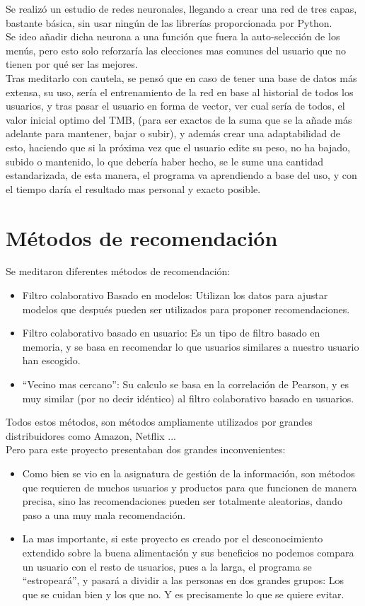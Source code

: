 Se realizó un estudio de redes neuronales, llegando a crear una red de tres capas, bastante básica, sin usar ningún de las librerías proporcionada por Python.\\

Se ideo añadir dicha neurona a una función que fuera la auto-selección de los menús, pero esto solo reforzaría las elecciones mas comunes del usuario que no tienen por qué ser las mejores.\\

Tras meditarlo con cautela, se pensó que en caso de tener una base de datos más extensa, su uso, sería el entrenamiento de la red en base al historial de todos los usuarios, y  tras pasar el usuario en forma de vector, ver cual sería de todos, el valor inicial optimo del TMB, (para ser exactos de la suma que se la añade más adelante para mantener, bajar o subir), y además crear una adaptabilidad de esto, haciendo que si la próxima vez que el usuario edite su peso, no ha bajado, subido o mantenido, lo que debería haber hecho, se le sume una cantidad estandarizada, de esta manera, el programa va aprendiendo a base del uso, y con el tiempo daría el resultado mas personal y exacto posible.\\
\section{Métodos de recomendación}
Se meditaron diferentes métodos de recomendación:
\begin{itemize}
\item	Filtro colaborativo Basado en modelos: Utilizan los datos para ajustar modelos que después pueden ser utilizados para proponer recomendaciones.
\item	Filtro colaborativo basado en usuario: Es un tipo de filtro basado en memoria, y se basa en recomendar lo que usuarios similares a nuestro usuario han escogido.
\item	“Vecino mas cercano”: Su calculo se basa en la correlación de Pearson, y es muy similar (por no decir idéntico) al filtro colaborativo basado en usuarios.
\end{itemize}

Todos estos métodos, son métodos ampliamente utilizados por grandes distribuidores como Amazon, Netflix ...\\
Pero para este proyecto presentaban dos grandes inconvenientes:
\begin{itemize}
\item	Como bien se vio en la asignatura de gestión de la información, son métodos que requieren de muchos usuarios y productos para que funcionen de manera precisa, sino las recomendaciones pueden ser totalmente aleatorias, dando paso a una muy mala recomendación.
\item	La mas importante, si este proyecto es creado por el desconocimiento extendido sobre la buena alimentación y sus beneficios no podemos compara un usuario con el resto de usuarios, pues a la larga, el programa se “estropeará”, y pasará a dividir a las personas en dos grandes grupos: Los que se cuidan bien y los que no. Y es precisamente lo que se quiere evitar.
\end{itemize}


